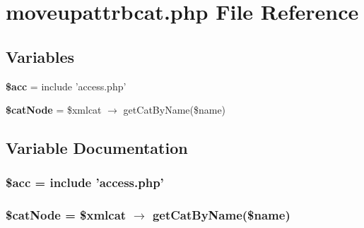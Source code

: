 \section{moveupattrbcat.php File Reference}
\label{moveupattrbcat_8php}


\subsection*{Variables}
\begin{CompactItemize}
\item 
{\bf \$acc} = include 'access.php'
\item 
{\bf \$cat\-Node} = \$xmlcat $\rightarrow$ get\-Cat\-By\-Name(\$name)
\end{CompactItemize}


\subsection{Variable Documentation}
\subsubsection{\setlength{\rightskip}{0pt plus 5cm}\$acc = include 'access.php'}\label{moveupattrbcat_8php_542926c588a05eb69553d79c83cf73da}


\subsubsection{\setlength{\rightskip}{0pt plus 5cm}\$cat\-Node = \$xmlcat $\rightarrow$ get\-Cat\-By\-Name(\$name)}\label{moveupattrbcat_8php_6b6a3d0442eb8cc5ad00f6cca24e154f}



